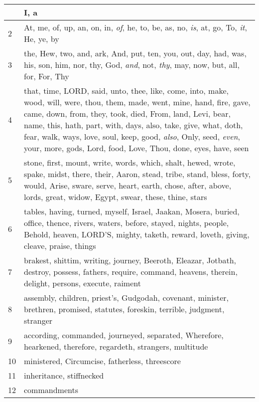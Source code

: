 \begin{longtable}{l|p{3.75in}}
\hline \hline
\endlastfoot
1 & I, a \\ \hline
2 & At, me, of, up, an, on, in, \emph{of}, he, to, be, as, no, \emph{is}, at, go, To, \emph{it}, He, ye, by \\ \hline
3 & the, Hew, two, and, ark, And, put, ten, you, out, day, had, was, his, son, him, nor, thy, God, \emph{and}, not, \emph{thy}, may, now, but, all, for, For, Thy \\ \hline
4 & that, time, LORD, said, unto, thee, like, come, into, make, wood, will, were, thou, them, made, went, mine, hand, fire, gave, came, down, from, they, took, died, From, land, Levi, bear, name, this, hath, part, with, days, also, take, give, what, doth, fear, walk, ways, love, soul, keep, good, \emph{also}, Only, seed, \emph{even}, your, more, gods, Lord, food, Love, Thou, done, eyes, have, seen \\ \hline
5 & stone, first, mount, write, words, which, shalt, hewed, wrote, spake, midst, there, their, Aaron, stead, tribe, stand, bless, forty, would, Arise, sware, serve, heart, earth, chose, after, above, lords, great, widow, Egypt, swear, these, thine, stars \\ \hline
6 & tables, having, turned, myself, Israel, Jaakan, Mosera, buried, office, thence, rivers, waters, before, stayed, nights, people, Behold, heaven, LORD'S, mighty, taketh, reward, loveth, giving, cleave, praise, things \\ \hline
7 & brakest, shittim, writing, journey, Beeroth, Eleazar, Jotbath, destroy, possess, fathers, require, command, heavens, therein, delight, persons, execute, raiment \\ \hline
8 & assembly, children, priest's, Gudgodah, covenant, minister, brethren, promised, statutes, foreskin, terrible, judgment, stranger \\ \hline
9 & according, commanded, journeyed, separated, Wherefore, hearkened, therefore, regardeth, strangers, multitude \\ \hline
10 & ministered, Circumcise, fatherless, threescore \\ \hline
11 & inheritance, stiffnecked \\ \hline
12 & commandments \\ \hline
\end{longtable}






